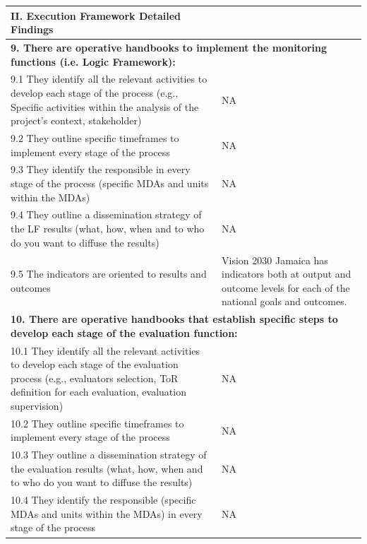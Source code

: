 \documentclass[
  10pt,
]{book}
\begin{document}
\begin{table}
\centering
\begin{tabular}[t]{l|l}
\hline
II. Execution Framework Detailed Findings &  \\
\hline
\multicolumn{2}{l}{\textbf{9. There are operative handbooks to implement the monitoring functions (i.e. Logic Framework):}}\\
\hline
\hspace{1em}9.1 They identify all the relevant activities to develop each stage of the process (e.g., Specific activities within the analysis of the project's context, stakeholder) & NA\\
\hline
\hspace{1em}9.2 They outline specific timeframes to implement every stage of the process & NA\\
\hline
\hspace{1em}9.3 They identify the responsible in every stage of the process (specific MDAs and units within the MDAs) & NA\\
\hline
\hspace{1em}9.4 They outline a dissemination strategy of the LF results (what, how, when and to who do you want to diffuse the results) & NA\\
\hline
\hspace{1em}9.5 The indicators are oriented to results and outcomes & Vision 2030 Jamaica has indicators both at output and outcome levels for each of the national goals and outcomes.\\
\hline
\multicolumn{2}{l}{\textbf{10. There are operative handbooks that establish specific steps to develop each stage of the evaluation function:}}\\
\hline
\hspace{1em}10.1 They identify all the relevant activities to develop each stage of the evaluation process (e.g., evaluators selection, ToR definition for each evaluation, evaluation supervision) & NA\\
\hline
\hspace{1em}10.2 They outline specific timeframes to implement every stage of the process & NA\\
\hline
\hspace{1em}10.3 They outline a dissemination strategy of the evaluation results (what, how, when and to who do you want to diffuse the results) & NA\\
\hline
\hspace{1em}10.4 They identify the responsible (specific MDAs and units within the MDAs) in every stage of the process & NA\\

\end{tabular}
\end{table}
\end{document}
